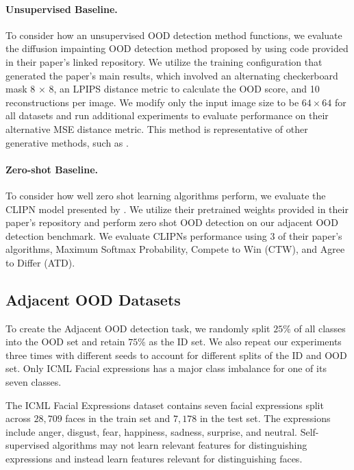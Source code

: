 \documentclass[11pt, oneside]{book}
\theoremstyle{plain}
\theoremstyle{definition}
\theoremstyle{remark}
\begin{document}
\paragraph{Unsupervised Baseline.}
To consider how an unsupervised OOD detection method functions, we evaluate the diffusion impainting OOD detection method proposed by \citet{liu2023unsupervised} using code provided in their paper's linked repository. We utilize the training configuration that generated the paper's main results, which involved an alternating checkerboard mask 8 × 8, an LPIPS distance metric to calculate the OOD score, and 10 reconstructions per image. We modify only the input image size to be $64\times64$ for all datasets and run additional experiments to evaluate performance on their alternative MSE distance metric. This method is representative of other generative methods, such as \citet{xiao2020likelihood}.

\paragraph{Zero-shot Baseline.}
To consider how well zero shot learning algorithms perform, we evaluate the CLIPN model presented by \citet{wang2023clipn}. We utilize their pretrained weights provided in their paper's repository and perform zero shot OOD detection on our adjacent OOD detection benchmark. We evaluate CLIPNs performance using 3 of their paper's algorithms, Maximum Softmax Probability, Compete to Win (CTW), and Agree to Differ (ATD).

\subsection{Adjacent OOD Datasets}

To create the Adjacent OOD detection task, we randomly split $25$\% of all classes into the OOD set and retain $75$\% as the ID set. We also repeat our experiments three times with different seeds to account for different splits of the ID and OOD set. Only ICML Facial expressions has a major class imbalance for one of its seven classes.

The ICML Facial Expressions dataset \citep{icmlface} contains seven facial expressions split across $28,709$ faces in the train set and $7,178$ in the test set. The expressions include anger, disgust, fear, happiness, sadness, surprise, and neutral. Self-supervised algorithms may not learn relevant features for distinguishing expressions and instead learn features relevant for distinguishing faces.
\end{document}

